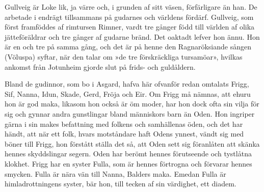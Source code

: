 Gullveig är Loke lik, ja värre och, i grunden af sitt väsen,
förfärligare än han. De arbetade i endrägt tillsammans på gudarnes och
världens fördärf. Gullveig, som först framföddes af rimtursen Rimner,
vardt tre gånger född till världen af olika jätteföräldrar och tre
gånger af gudarne bränd. Det
\protect\hypertarget{lb1625905.xhtmlux5cux23start34}{}{}\protect\hypertarget{lb1625905.xhtmlux5cux23start34-a}{}{}\protect\hypertarget{lb1625905.xhtmlux5cux23start34-b}{}{}\protect\hypertarget{lb1625905.xhtmlux5cux23start34-c}{}{}\protect\hypertarget{lb1625905.xhtmlux5cux23start34-d}{}{}
oaktadt lefver hon ännu. Hon är en och tre på samma gång, och det är på
henne den Ragnaröksiande sången (Völuspa) syftar, när den talar om »de
tre förskräckliga tursamöar», hvilkas ankomst från Jotunheim gjorde slut
på frids- och guldåldern.

Bland de gudinnor, som bo i Asgard, hafva här ofvanför redan omtalats
Frigg, Sif, Nanna, Idun, Skade, Gerd, Fröja och Eir. Om Frigg må nämnas,
att ehuru hon är god maka, likasom hon också är öm moder, har hon dock
ofta sin vilja för sig och gynnar andra gunstlingar bland människors
barn än Oden. Hon ingriper gärna i sin makes befattning med folkens och
samhällenas öden, och det har händt, att när ett folk, hvars motståndare
haft Odens ynnest, vändt sig med böner till Frigg, hon förstått ställa
det så, att Oden sett sig föranlåten att skänka hennes skyddslingar
segern. Oden har berömt hennes förutseende och tystlåtna klokhet. Frigg
har en syster Fulla, som är hennes förtrogna och förvarar hennes
smycken. Fulla är nära vän till Nanna, Balders maka. Emedan Fulla är
himladrottningens syster, bär hon, till tecken af sin värdighet, ett
diadem.

